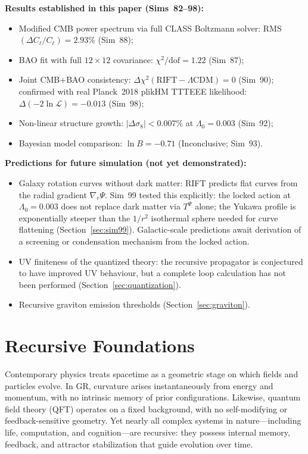 \documentclass[12pt,a4paper]{article}
\begin{document}
\noindent\textbf{Results established in this paper (Sims~82--98):}
\begin{itemize}
  \item Modified CMB power spectrum via full CLASS Boltzmann solver:
        RMS$(\Delta C_\ell/C_\ell) = 2.93\%$ (Sim~88);
  \item BAO fit with full $12\times12$ covariance:
        $\chi^2/\mathrm{dof} = 1.22$ (Sim~87);
  \item Joint CMB+BAO consistency: $\Delta\chi^2(\mathrm{RIFT}-\Lambda\mathrm{CDM}) = 0$
        (Sim~90); confirmed with real Planck~2018 plikHM TTTEEE likelihood:
        $\Delta(-2\ln\mathcal{L}) = -0.013$ (Sim~98);
  \item Non-linear structure growth: $|\Delta\sigma_8| < 0.007\%$ at
        $\Lambda_0 = 0.003$ (Sim~92);
  \item Bayesian model comparison: $\ln B = -0.71$ (Inconclusive; Sim~93).
\end{itemize}

\noindent\textbf{Predictions for future simulation (not yet demonstrated):}
\begin{itemize}
  \item Galaxy rotation curves without dark matter: RIFT predicts flat curves
        from the radial gradient $\nabla_r\Psi$. Sim~99 tested this explicitly:
        the locked action at $\Lambda_0 = 0.003$ does not replace dark matter via
        $T^{\Psi}$ alone; the Yukawa profile is exponentially steeper than the
        $1/r^2$ isothermal sphere needed for curve flattening
        (Section~\ref{sec:sim99}). Galactic-scale predictions await derivation
        of a screening or condensation mechanism from the locked action.
  \item UV finiteness of the quantized theory: the recursive propagator is
        conjectured to have improved UV behaviour, but a complete loop calculation
        has not been performed (Section~\ref{sec:quantization}).
  \item Recursive graviton emission thresholds (Section~\ref{sec:graviton}).
\end{itemize}

\section{Recursive Foundations}
\label{sec:foundations}

Contemporary physics treats spacetime as a geometric stage on which
fields and particles evolve. In GR, curvature arises instantaneously
from energy and momentum, with no intrinsic memory of prior configurations.
Likewise, quantum field theory (QFT) operates on a fixed background,
with no self-modifying or feedback-sensitive geometry. Yet nearly all
complex systems in nature---including life, computation, and cognition---are
recursive: they possess internal memory, feedback, and attractor
stabilization that guide evolution over time.
\end{document}
